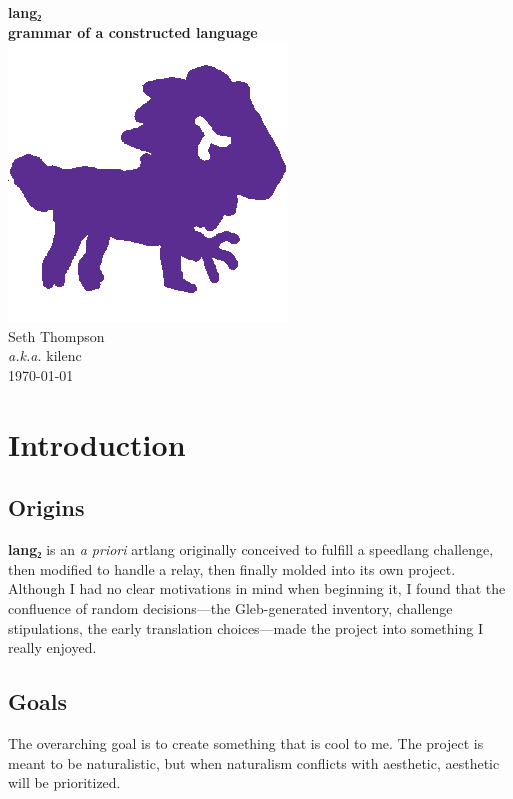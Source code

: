 \documentclass[fontsize=12pt,twoside=false,numbers=noenddot]{class/kaobook}
\title[\langname{} Grammar]{\langname{}}
\subtitle{a grammar of a constructed language}
\author{kilenc}
\date{\today}
\newcommand{\langname}{\textbf{lang₂}}
\renewcommand{\bf}{\bfseries}
\begin{document}
\frontmatter

\begin{titlepage} \centering
	\hspace{0pt} \vfill
	{\huge \langname{} } \\\medbreak 
	{\large \bf grammar of a constructed language} \\\bigbreak
	\includegraphics[width=0.25\linewidth]{lang2-lion.png} \\\bigbreak
	{\large Seth Thompson \\ \small \emph{a.k.a.} kilenc} \\\bigbreak
	{\small \today}
	\vfill \hspace{0pt}
\end{titlepage}

\setlength{\textheight}{23cm} %
\etocstandarddisplaystyle %
\etocstandardlines %
\tableofcontents 


\setchapterpreamble[u]{\margintoc}
\chapter{Introduction}
\section{Origins}
\langname{} is an \emph{a priori} artlang originally conceived to fulfill a speedlang challenge, then modified to handle a relay, then finally molded into its own project. Although I had no clear motivations in mind when beginning it, I found that the confluence of random decisions---the Gleb-generated inventory, challenge stipulations, the early translation choices---made the project into something I really enjoyed.

\section{Goals}
The overarching goal is to create something that is cool to me. The project is meant to be naturalistic, but when naturalism conflicts with aesthetic, aesthetic will be prioritized.
\end{document}
